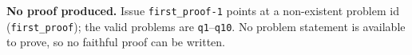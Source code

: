 \documentclass{article}
\begin{document}
%
%

\noindent\textbf{No proof produced.} Issue \texttt{first\_proof-1} points at a
non-existent problem id (\texttt{first\_proof}); the valid problems are
\texttt{q1}--\texttt{q10}. No problem statement is available to prove, so no
faithful proof can be written.
\end{document}
